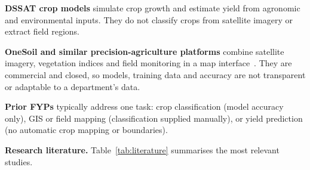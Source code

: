 \textbf{DSSAT crop models} simulate crop growth and estimate yield from agronomic and environmental
inputs. They do not classify crops from satellite imagery or extract field regions.

\textbf{OneSoil and similar precision-agriculture platforms} combine satellite imagery, vegetation
indices and field monitoring in a map interface~\cite{onesoil2026}. They are commercial and
closed, so models, training data and accuracy are not transparent or adaptable to a department's
data.

\textbf{Prior FYPs} typically address one task: crop classification (model accuracy only), GIS or
field mapping (classification supplied manually), or yield prediction (no automatic crop mapping or
boundaries).

\textbf{Research literature.} Table~\ref{tab:literature} summarises the most relevant studies.


